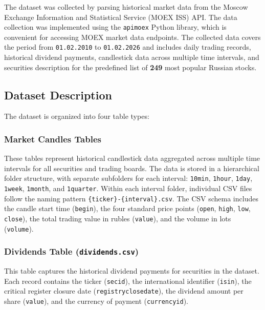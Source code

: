 \documentclass[oneside,final,12pt,a4paper]{extreport}
\begin{document}
The dataset was collected by parsing historical market data from the Moscow Exchange Information and Statistical Service (MOEX ISS) API. The data collection was implemented using the \texttt{apimoex} Python library, which is convenient for accessing MOEX market data endpoints. The collected data covers the period from \texttt{01.02.2010} to \texttt{01.02.2026} and includes daily trading records, historical dividend payments, candlestick data across multiple time intervals, and securities description for the predefined list of \textbf{249} most popular Russian stocks.

\subsection{Dataset Description}
The dataset is organized into four table types:

\subsubsection{Market Candles Tables}
These tables represent historical candlestick data aggregated across multiple time intervals for all securities and trading boards. The data is stored in a hierarchical folder structure, with separate subfolders for each interval: \texttt{10min}, \texttt{1hour}, \texttt{1day}, \texttt{1week}, \texttt{1month}, and \texttt{1quarter}. Within each interval folder, individual CSV files follow the naming pattern \texttt{\{ticker\}-\{interval\}.csv}. The CSV schema includes the candle start time (\texttt{begin}), the four standard price points (\texttt{open}, \texttt{high}, \texttt{low}, \texttt{close}), the total trading value in rubles (\texttt{value}), and the volume in lots (\texttt{volume}).

\subsubsection{Dividends Table (\texttt{dividends.csv})}
This table captures the historical dividend payments for securities in the dataset. Each record contains the ticker (\texttt{secid}), the international identifier (\texttt{isin}), the critical register closure date (\texttt{registryclosedate}), the dividend amount per share (\texttt{value}), and the currency of payment (\texttt{currencyid}).
\end{document}
